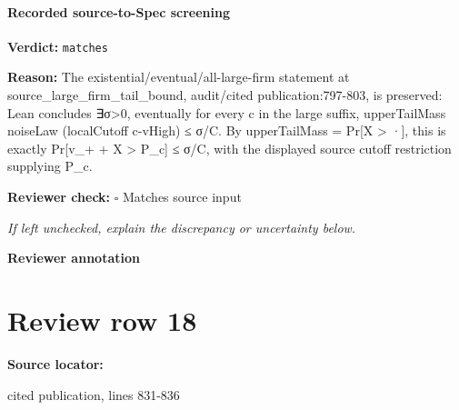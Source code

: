 \documentclass[10pt]{article}
\newcommand{\reviewerbox}{%
  \par\noindent\fbox{\parbox{0.96\linewidth}{\rule{0pt}{0.38in}}}\par
}
\newcommand{\reviewmatch}[1]{%
  \par\noindent\textbf{Reviewer check:} $\square$\; #1\par
  \noindent\emph{If left unchecked, explain the discrepancy or uncertainty below.}\par
}
\begin{document}
\paragraph{Recorded source-to-Spec screening}
\textbf{Verdict:} \texttt{matches}
\\
{\raggedright
\textbf{Reason:} The existential/\allowbreak{}eventual/\allowbreak{}all-\allowbreak{}large-\allowbreak{}firm statement at source\_\allowbreak{}large\_\allowbreak{}firm\_\allowbreak{}tail\_\allowbreak{}bound, audit/\allowbreak{}cited publication:\allowbreak{}797-\allowbreak{}803, is preserved:\allowbreak{} Lean concludes ∃σ>0, eventually for every c in the large suffix, upperTailMass noiseLaw (localCutoff c-\allowbreak{}vHigh) ≤ σ/\allowbreak{}C.\allowbreak{} By upperTailMass = Pr[X > ·], this is exactly Pr[v\_\allowbreak{}+ + X > P\_\allowbreak{}c] ≤ σ/\allowbreak{}C, with the displayed source cutoff restriction supplying P\_\allowbreak{}c.\allowbreak{}
\par}
\reviewmatch{Matches source input}
\noindent\textbf{Reviewer annotation}\par
\reviewerbox
\clearpage
\hypertarget{source-claim-0e9edb794ea448f5}{}
\section*{Review row 18}
\textbf{Source locator:} {\footnotesize\raggedright cited publication, lines 831-\allowbreak{}836\par}
\end{document}
